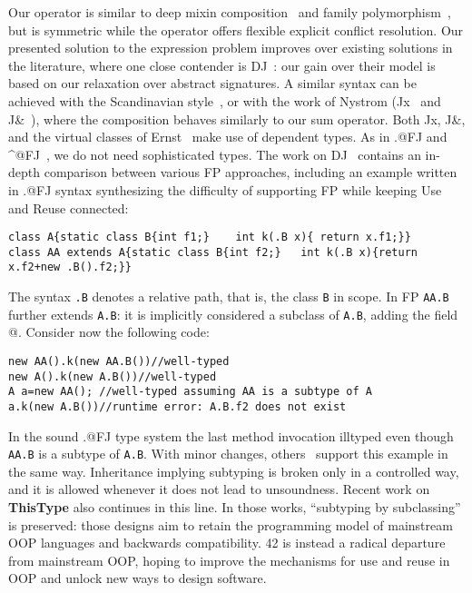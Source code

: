 Our \Q@Use@ operator is similar to deep mixin
composition~\cite{ernst99a,Zenger-Odersky2005, Hutchins06}
and family polymorphism~\cite{Ernst06, igarashi2005lightweight,
IgarashiViroli07, IgarashiEtAl08}, but is symmetric while the operator
\Q@super@ offers flexible  explicit conflict resolution.
Our presented solution to the expression problem improves over existing solutions in the literature, where one close contender is DJ~\cite{deep}: our gain over their model is based on our relaxation over abstract signatures.
A similar syntax can be achieved with the Scandinavian style~\cite{ernst2004expression}, or with the work of 
Nystrom (Jx~\cite{NystromEtAl04} and
J\&~\cite{nystrom2006j}), where the composition behaves similarly to our sum operator.
Both Jx, J\&, and the virtual classes of Ernst~\cite{Ernst06}
make use of dependent types.
As in \Q@.@FJ and \Q@^@FJ~\cite{igarashi2005lightweight,IgarashiEtAl08,IgarashiViroli07,saito2008essence},
 we do not need sophisticated types. 
The work on DJ~\cite{deep} contains an in-depth comparison between various FP approaches, including an example written in \Q@.@FJ syntax synthesizing the difficulty of supporting FP while keeping Use and Reuse connected:
\begin{lstlisting}
class A{static class B{int f1;}    int k(.B x){ return x.f1;}}
class AA extends A{static class B{int f2;}   int k(.B x){return x.f2+new .B().f2;}}
\end{lstlisting}
The syntax \lstinline{.B} denotes a relative path, that is, the 
class \lstinline{B} in scope.
In FP \lstinline{AA.B} further extends \lstinline{A.B}: it is implicitly considered a subclass of \lstinline{A.B}, adding the field @.
Consider now the following code:
\begin{lstlisting}
new AA().k(new AA.B())//well-typed
new A().k(new A.B())//well-typed
A a=new AA(); //well-typed assuming AA is a subtype of A
a.k(new A.B())//runtime error: A.B.f2 does not exist
\end{lstlisting}
In the sound \Q@.@FJ type system the last method invocation illtyped even though \lstinline{AA.B} is a subtype of \lstinline{A.B}.
With minor changes, others~\cite{nystrom2006j,Ernst06,BruceEtAl98,IgarashiViroli07}
support this example in the same way.
Inheritance implying subtyping is broken only in a controlled way, and it is allowed whenever it does not lead to unsoundness.
Recent work on \textbf{ThisType} \cite{Saito:2009,ryu16ThisType}
also continues in this line.
In those works, ``subtyping by subclassing'' is preserved: those designs aim to retain the programming model of mainstream OOP languages and backwards compatibility. 42 is instead a radical departure from mainstream OOP, hoping to improve the mechanisms for use and reuse in OOP and unlock new ways to design software.

